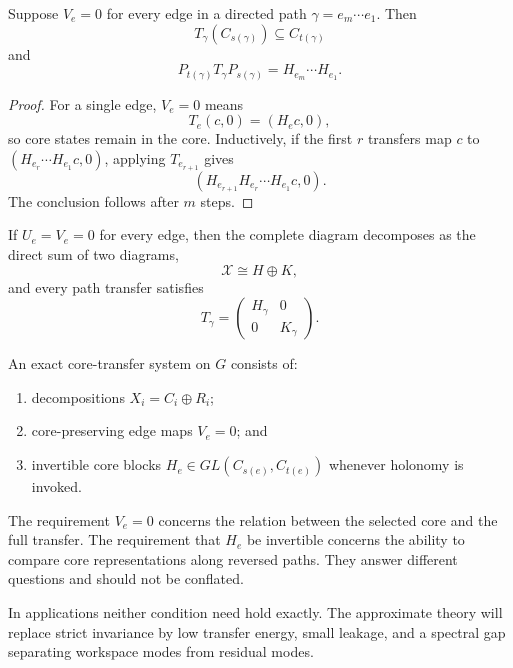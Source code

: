 \begin{SRWTproposition}\label{SRWT:prop:pathwise-preservation}
Suppose \(V_e=0\) for every edge in a directed path
\(\gamma=e_m\cdots e_1\). Then
\[
T_\gamma(C_{s(\gamma)})\subseteq C_{t(\gamma)}
\]
and
\[
P_{t(\gamma)}T_\gamma P_{s(\gamma)}
=
H_{e_m}\cdots H_{e_1}.
\]
\end{SRWTproposition}

\begin{proof}
For a single edge, \(V_e=0\) means
\[
T_e(c,0)=(H_ec,0),
\]
so core states remain in the core. Inductively, if the first \(r\) transfers
map \(c\) to \((H_{e_r}\cdots H_{e_1}c,0)\), applying \(T_{e_{r+1}}\) gives
\[
(H_{e_{r+1}}H_{e_r}\cdots H_{e_1}c,0).
\]
The conclusion follows after \(m\) steps.
\end{proof}

\begin{SRWTcorollary}\label{SRWT:cor:autonomous-splitting}
If \(U_e=V_e=0\) for every edge, then the complete diagram decomposes as the
direct sum of two diagrams,
\[
\mathcal X\cong H\oplus K,
\]
and every path transfer satisfies
\[
T_\gamma
=
\begin{pmatrix}
H_\gamma&0\\
0&K_\gamma
\end{pmatrix}.
\]
\end{SRWTcorollary}


\begin{SRWTdefinition}\label{SRWT:def:exact-core-transfer}
An exact core-transfer system on \(G\) consists of:
\begin{enumerate}
\item decompositions \(X_i=C_i\oplus R_i\);
\item core-preserving edge maps \(V_e=0\); and
\item invertible core blocks \(H_e\in GL(C_{s(e)},C_{t(e)})\) whenever
holonomy is invoked.
\end{enumerate}
\end{SRWTdefinition}

The requirement \(V_e=0\) concerns the relation between the selected core and
the full transfer. The requirement that \(H_e\) be invertible concerns the
ability to compare core representations along reversed paths. They answer
different questions and should not be conflated.

\begin{SRWTremark}
In applications neither condition need hold exactly. The approximate theory
will replace strict invariance by low transfer energy, small leakage, and a
spectral gap separating workspace modes from residual modes.
\end{SRWTremark}

